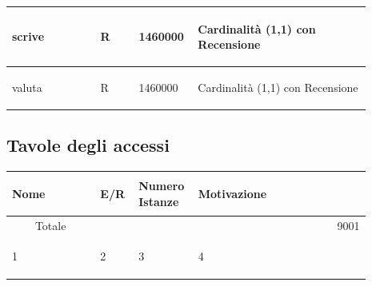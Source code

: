 \documentclass[12pt,a4paper]{article}
\begin{document}
\begin{center}
\begin{longtable}{|p{0.23\linewidth}|p{0.1\linewidth}|p{0.11\linewidth}|p{0.45\linewidth}|}
\hline
scrive
 & 
\begin{center}\vspace{-25pt}R\end{center}
 & 
\begin{center}\vspace{-25pt}1460000\end{center}
 & 
\begin{flushleft}\vspace{-25pt}Cardinalità (1,1) con Recensione\end{flushleft}
\\

\hline
valuta
 & 
\begin{center}\vspace{-25pt}R\end{center}
 & 
\begin{center}\vspace{-25pt}1460000\end{center}
 & 
\begin{flushleft}\vspace{-25pt}Cardinalità (1,1) con Recensione\end{flushleft}
\\

\hline

\end{longtable}\end{center}




\subsection{Tavole degli accessi}
\label{sec:accessi}
\begin{center}\setlength{\extrarowheight}{1.5pt}\begin{longtable}{|p{0.23\linewidth}|p{0.1\linewidth}|p{0.11\linewidth}|p{0.45\linewidth}|}\hline \textbf{Nome}   & \begin{center}\vspace{-15pt}\textbf{E/R}\end{center} & \textbf{Numero Istanze} & \textbf{Motivazione}\\ 
\hline
\multicolumn{1}{|c|}{Totale}
 & 
\multicolumn{3}{|r|}{9001}
\\
\hline
1
 & 
\begin{center}\vspace{-25pt}2\end{center}
 & 
\begin{center}\vspace{-25pt}3\end{center}
 & 
\begin{flushleft}\vspace{-25pt}4\end{flushleft}
\\
\hline
\end{longtable}\end{center}
\end{document}
